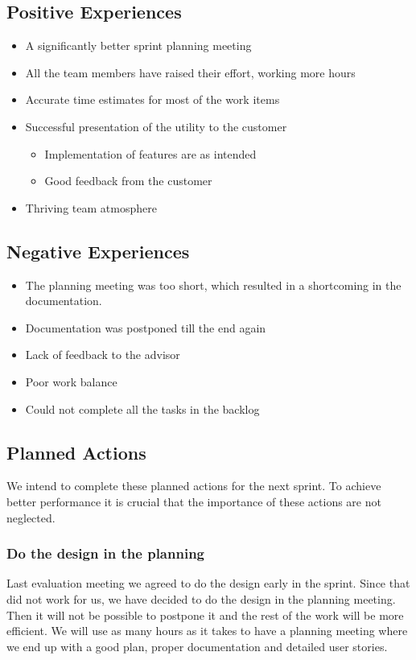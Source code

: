 \subsection{Positive Experiences}
\begin{itemize}
	\item A significantly better sprint planning meeting
	\item All the team members have raised their effort, working more hours
	\item Accurate time estimates for most of the work items
	\item Successful presentation of the \gls{utility} to the customer
	\begin {itemize}
		\item Implementation of features are as intended
		\item Good feedback from the customer
	\end{itemize}
	\item Thriving team atmosphere
\end{itemize}



\subsection{Negative Experiences}
\begin{itemize}
	\item The planning meeting was too short, which resulted in a shortcoming in the documentation.
	\item Documentation was postponed till the end again
	\item Lack of feedback to the advisor
	\item Poor work balance
	\item Could not complete all the tasks in the backlog
\end{itemize}


\subsection{Planned Actions}
We intend to complete these planned actions for the next sprint. To achieve better performance it is crucial that the importance of these actions are not neglected.

\subsubsection{Do the design in the planning}
Last evaluation meeting we agreed to do the design early in the sprint. Since that did not work for us, we have decided to do the design in the planning meeting. Then it will not be possible to postpone it and the rest of the work will be more efficient. We will use as many hours as it takes to have a planning meeting where we end up with a good plan, proper documentation and detailed user stories.

